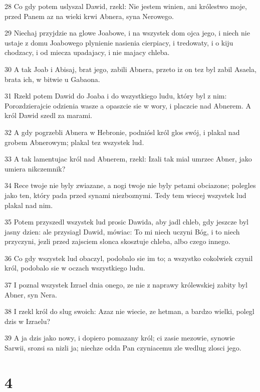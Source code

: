 \par 28 Co gdy potem uslyszal Dawid, rzekl: Nie jestem winien, ani królestwo moje, przed Panem az na wieki krwi Abnera, syna Nerowego.
\par 29 Niechaj przyjdzie na glowe Joabowe, i na wszystek dom ojca jego, i niech nie ustaje z domu Joabowego plynienie nasienia cierpiacy, i tredowaty, i o kiju chodzacy, i od miecza upadajacy, i nie majacy chleba.
\par 30 A tak Joab i Abisaj, brat jego, zabili Abnera, przeto iz on tez byl zabil Asaela, brata ich, w bitwie u Gabaona.
\par 31 Rzekl potem Dawid do Joaba i do wszystkiego ludu, który byl z nim: Porozdzierajcie odzienia wasze a opaszcie sie w wory, i placzcie nad Abnerem. A król Dawid szedl za marami.
\par 32 A gdy pogrzebli Abnera w Hebronie, podniósl król glos swój, i plakal nad grobem Abnerowym; plakal tez wszystek lud.
\par 33 A tak lamentujac król nad Abnerem, rzekl: Izali tak mial umrzec Abner, jako umiera nikczemnik?
\par 34 Rece twoje nie byly zwiazane, a nogi twoje nie byly petami obciazone; polegles jako ten, który pada przed synami niezboznymi. Tedy tem wiecej wszystek lud plakal nad nim.
\par 35 Potem przyszedl wszystek lud prosic Dawida, aby jadl chleb, gdy jeszcze byl jasny dzien: ale przysiagl Dawid, mówiac: To mi niech uczyni Bóg, i to niech przyczyni, jezli przed zajsciem slonca skosztuje chleba, albo czego innego.
\par 36 Co gdy wszystek lud obaczyl, podobalo sie im to; a wszystko cokolwiek czynil król, podobalo sie w oczach wszystkiego ludu.
\par 37 I poznal wszystek Izrael dnia onego, ze nie z naprawy królewskiej zabity byl Abner, syn Nera.
\par 38 I rzekl król do slug swoich: Azaz nie wiecie, ze hetman, a bardzo wielki, polegl dzis w Izraelu?
\par 39 A ja dzis jako nowy, i dopiero pomazany król; ci zasie mezowie, synowie Sarwii, srozsi sa nizli ja; niechze odda Pan czyniacemu zle wedlug zlosci jego.

\chapter{4}

